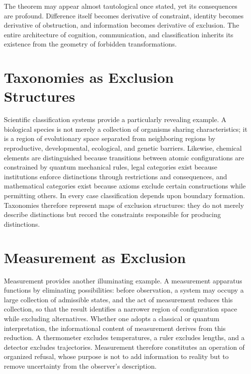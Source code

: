 \documentclass[11pt,oneside]{book}
\theoremstyle{plain}
\theoremstyle{definition}
\theoremstyle{remark}
\begin{document}
The theorem may appear almost tautological once stated, yet its consequences are profound. Difference itself becomes derivative of constraint, identity becomes derivative of obstruction, and information becomes derivative of exclusion. The entire architecture of cognition, communication, and classification inherits its existence from the geometry of forbidden transformations.

\section{Taxonomies as Exclusion Structures}

Scientific classification systems provide a particularly revealing example. A biological species is not merely a collection of organisms sharing characteristics; it is a region of evolutionary space separated from neighboring regions by reproductive, developmental, ecological, and genetic barriers. Likewise, chemical elements are distinguished because transitions between atomic configurations are constrained by quantum mechanical rules, legal categories exist because institutions enforce distinctions through restrictions and consequences, and mathematical categories exist because axioms exclude certain constructions while permitting others. In every case classification depends upon boundary formation. Taxonomies therefore represent maps of exclusion structures: they do not merely describe distinctions but record the constraints responsible for producing distinctions.

\section{Measurement as Exclusion}

Measurement provides another illuminating example. A measurement apparatus functions by eliminating possibilities: before observation, a system may occupy a large collection of admissible states, and the act of measurement reduces this collection, so that the result identifies a narrower region of configuration space while excluding alternatives. Whether one adopts a classical or quantum interpretation, the informational content of measurement derives from this reduction. A thermometer excludes temperatures, a ruler excludes lengths, and a detector excludes trajectories. Measurement therefore constitutes an operation of organized refusal, whose purpose is not to add information to reality but to remove uncertainty from the observer's description.
\end{document}
